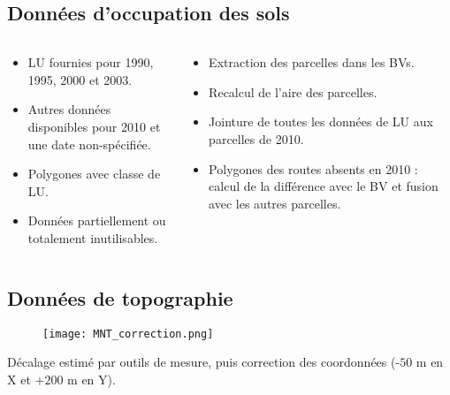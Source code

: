 \documentclass[aspectratio=169]{beamer}
\begin{document}
\subsection{Données d\rq{}occupation des sols}

\begin{frame}
\begin{columns}
	\begin{column}{0.5\textwidth}
		\begin{itemize}
		\setlength{\itemsep}{10pt}
		\item LU fournies pour 1990, 1995, 2000 et 2003.
		\item Autres données disponibles pour 2010 et une date non-spécifiée.
		\item Polygones avec classe de LU.
		\item Données partiellement ou totalement inutilisables.
		\end{itemize}
	\end{column}
	\begin{column}{0.5\textwidth}
		\begin{itemize}
		\setlength{\itemsep}{10pt}
		\item Extraction des parcelles dans les BVs.
		\item Recalcul de l\rq{}aire des parcelles.
		\item Jointure de toutes les données de LU aux parcelles de 2010.
		\item Polygones des routes absents en 2010 : calcul de la différence avec le  BV et fusion avec les autres parcelles.
		\end{itemize}
	\end{column}
\end{columns}
	\vspace{1cm}
	{\scriptsize
	\cite{city_of_austin_planning_and_development_review_2010_2021, city_of_austin_planning_and_development_review_land_2021}}
\end{frame}

\subsection{Données de topographie}

\begin{frame}
	\begin{figure}
	 	\texttt{[image: MNT\_correction.png]}
	\end{figure}
Décalage estimé par outils de mesure, puis correction des coordonnées ($‐50$ m en X et $+200$ m en Y).
\end{frame}
\end{document}
